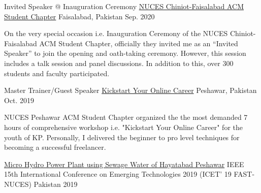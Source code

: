 


\begin{cventries}


\cventry
{Invited Speaker @ Inauguration Ceremony} %
{\href{http://cfd.nu.edu.pk/acm}{NUCES Chiniot-Faisalabad ACM Student Chapter}} %
{Faisalabad, Pakistan} %
{Sep. 2020} %
{ %
\begin{cvitems}
\item {On the very special occasion i.e. Inauguration Ceremony of the NUCES Chiniot-Faisalabad ACM Student Chapter, officially they invited me as an “Invited Speaker” to join the opening and oath-taking ceremony. However, this session includes a talk session and panel discussions. In addition to this, over 300 students and faculty participated.
}
\end{cvitems}
}


\cventry
{Master Trainer/Guest Speaker} %
{\href{https://fb.me/e/1BwSkaMTL}{Kickstart Your Online Career}} %
{Peshawar, Pakistan} %
{Oct. 2019} %
{ %
\begin{cvitems}
\item {NUCES Peshawar ACM Student Chapter organized the the most demanded 7 hours of comprehensive workshop i.e. "Kickstart Your Online Career" for the youth of KP. Personally, I delivered the beginner to pro level techniques for becoming a successful freelancer.
}
\end{cvitems}
}




\begin{cvhonors}


\cvhonor
{\href{https://ieeexplore.ieee.org/document/8994728}{Micro Hydro Power Plant using Sewage Water of Hayatabad Peshawar}} %
{IEEE 15th International Conference on Emerging Technologies 2019 (ICET' 19 FAST-NUCES)
} %
{Pakistan} %
{2019} %
\end{cvhonors}


\end{cventries}